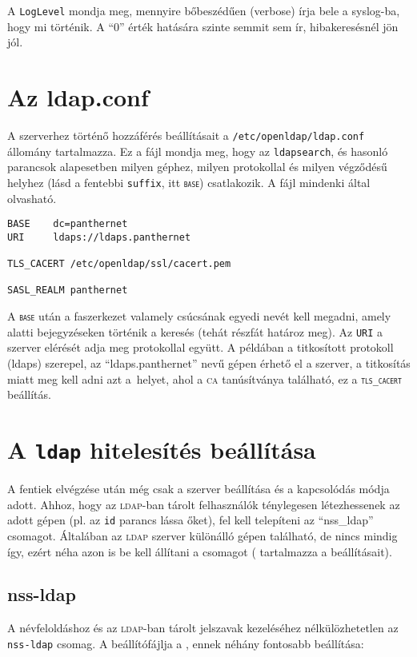 A \texttt{LogLevel} mondja meg, mennyire bőbeszédűen (verbose) írja bele a syslog-ba, hogy mi történik. A ``0'' érték
hatására szinte semmit sem ír, hibakeresésnél jön jól.

\section{Az ldap.conf}
A szerverhez történő hozzáférés beállításait a \texttt{/etc/openldap/ldap.conf} állomány tartalmazza.
Ez a fájl mondja meg, hogy az \texttt{ldapsearch}, és hasonló parancsok alapesetben milyen géphez, milyen protokollal
és milyen végződésű helyhez (lásd a fentebbi \texttt{suffix}, itt \texttt{\textsc{base}}) csatlakozik. A fájl mindenki által
olvasható.

\begin{Verbatim}[frame=single,label=ldap.conf]
BASE    dc=panthernet
URI     ldaps://ldaps.panthernet

TLS_CACERT /etc/openldap/ssl/cacert.pem

SASL_REALM panthernet
\end{Verbatim}


A \texttt{\textsc{base}} után a faszerkezet valamely csúcsának egyedi nevét kell megadni, amely alatti bejegyzéseken történik a
keresés (tehát részfát határoz meg). Az \texttt{URI} a szerver elérését adja meg protokollal együtt. A példában
a titkosított protokoll (ldaps) szerepel, az ``ldaps.panthernet'' nevű gépen érhető el a szerver, a titkosítás miatt meg
kell adni azt a~helyet, ahol a \textsc{ca} tanúsítványa található, ez a \texttt{\textsc{tls}\_\textsc{cacert}} beállítás.

\section{A \texttt{ldap} hitelesítés beállítása}
A fentiek elvégzése után még csak a szerver beállítása és a kapcsolódás módja adott. Ahhoz, hogy az \textsc{ldap}-ban tárolt
felhasználók ténylegesen létezhessenek az adott gépen (pl. az \texttt{id} parancs lássa őket), fel kell telepíteni 
az ``nss\_ldap'' csomagot. Általában az \textsc{ldap}
szerver különálló gépen található, de nincs mindig így, ezért néha azon is be kell állítani a csomagot
( tartalmazza a beállításait).

\subsection{nss-ldap}
A névfeloldáshoz és az \textsc{ldap}-ban tárolt jelszavak kezeléséhez nélkülözhetetlen az \texttt{nss-ldap} csomag. A
beállítófájlja a , ennek néhány fontosabb beállítása:

